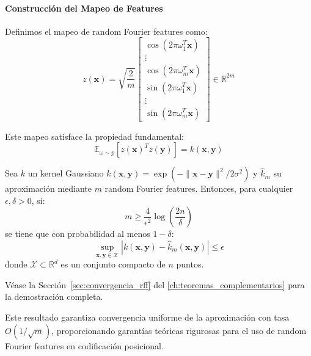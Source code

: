 \paragraph{Construcción del Mapeo de Features}

Definimos el mapeo de random Fourier features como:
\begin{equation}
z(\mathbf{x}) = \sqrt{\frac{2}{m}} \begin{bmatrix} \cos(2\pi \omega_1^T \mathbf{x}) \\ \vdots \\ \cos(2\pi \omega_m^T \mathbf{x}) \\ \sin(2\pi \omega_1^T \mathbf{x}) \\ \vdots \\ \sin(2\pi \omega_m^T \mathbf{x}) \end{bmatrix} \in \mathbb{R}^{2m}
\end{equation}

Este mapeo satisface la propiedad fundamental:
\begin{equation}
\mathbb{E}_{\omega \sim p}[z(\mathbf{x})^T z(\mathbf{y})] = k(\mathbf{x}, \mathbf{y})
\end{equation}

\begin{theorem}
Sea $k$ un kernel Gaussiano $k(\mathbf{x}, \mathbf{y}) = \exp(-\|\mathbf{x} - \mathbf{y}\|^2 / 2\sigma^2)$ y $\hat{k}_m$ su aproximación mediante $m$ random Fourier features. Entonces, para cualquier $\epsilon, \delta > 0$, si:
\begin{equation}
m \geq \frac{4}{\epsilon^2} \log\left(\frac{2n}{\delta}\right)
\end{equation}
se tiene que con probabilidad al menos $1 - \delta$:
\begin{equation}
\sup_{\mathbf{x}, \mathbf{y} \in \mathcal{X}} |k(\mathbf{x}, \mathbf{y}) - \hat{k}_m(\mathbf{x}, \mathbf{y})| \leq \epsilon
\end{equation}
donde $\mathcal{X} \subset \mathbb{R}^d$ es un conjunto compacto de $n$ puntos.

Véase la Sección~\ref{sec:convergencia_rff} del \autoref{ch:teoremas_complementarios} para la demostración completa.
\end{theorem}

Este resultado garantiza convergencia uniforme de la aproximación con tasa $O(1/\sqrt{m})$, proporcionando garantías teóricas rigurosas para el uso de random Fourier features en codificación posicional.

